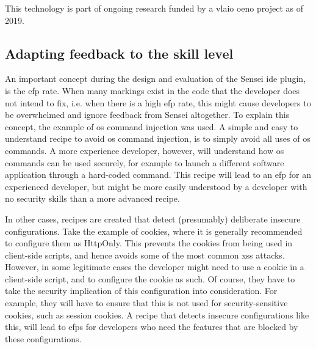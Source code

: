 This technology is part of ongoing research funded by a \gls{vlaio} \gls{oeno} project as of 2019.

\subsection{Adapting feedback to the skill level}
An important concept during the design and evaluation of the Sensei \gls{ide} plugin, is the \gls{efp} rate.
When many markings exist in the code that the developer does not intend to fix, i.e. when there is a high \gls{efp} rate, this might cause developers to be overwhelmed and ignore feedback from Sensei altogether.
To explain this concept, the example of \gls{os} command injection was used.
A simple and easy to understand recipe to avoid \gls{os} command injection, is to simply avoid all uses of \gls{os} commands.
A more experience developer, however, will understand how \gls{os} commands can be used securely, for example to launch a different software application through a hard-coded command.
This recipe will lead to an \gls{efp} for an experienced developer, but might be more easily understood by a developer with no security skills than a more advanced recipe.

In other cases, recipes are created that detect (presumably) deliberate insecure configurations.
Take the example of cookies, where it is generally recommended to configure them as HttpOnly.
This prevents the cookies from being used in client-side scripts, and hence avoids some of the most common \gls{xss} attacks.
However, in some legitimate cases the developer might need to use a cookie in a client-side script, and to configure the cookie as such.
Of course, they have to take the security implication of this configuration into consideration.
For example, they will have to ensure that this is not used for security-sensitive cookies, such as session cookies.
A recipe that detects insecure configurations like this, will lead to \glspl{efp} for developers who need the features that are blocked by these configurations.

